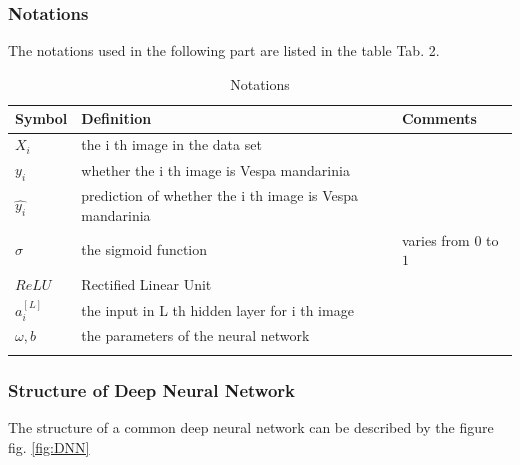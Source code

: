 \documentclass{mcmthesis}
\begin{document}
\subsubsection{Notations}
The notations used in the following part are listed in the table Tab. 2.

\begin{table}[htbp]
\centering
\begin{tabular}{lll}
\hline 
Symbol & Definition & Comments \\
\hline
$X_i$ & the i th image in the data set & \\
$y_i$ & whether the i th image is Vespa mandarinia & \\
$ \hat{y_i}$ &  prediction of whether the i th image is Vespa mandarinia & \\
$\sigma $ & the sigmoid function & varies from 0 to $1$ \\
$ReLU$ & Rectified Linear Unit \\
$a_{i}^{[L]}$ & the input in L th hidden layer for i th image & \\

$\omega, b$ & the parameters of the neural network &  \\
\hline
\label{tab:2}
\end{tabular}
\caption{Notations}
\end{table}

\subsubsection{Structure of Deep Neural Network}

The structure of a common deep neural network can be described by the figure fig. \ref{fig:DNN}
\end{document}
